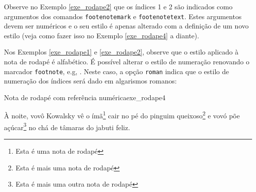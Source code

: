 Observe no Exemplo \ref{exe_rodape2} que os índices 1 e 2 são indicados como argumentos dos comandos {\tt footenotemark} e {\tt footenotetext}. Estes argumentos devem ser numéricos e o seu estilo é apenas alterado com a definição de um novo estilo (veja como fazer isso no Exemplo \ref{exe_rodape4} a diante).

%


Nos Exemplos \ref{exe_rodape1} e \ref{exe_rodape2}, observe que o estilo aplicado à nota de rodapé é alfabético. É possível alterar o estilo de numeração renovando o marcador {\tt footnote}, e.g, \texttt{\renewcommand{\thefootnote}{\roman{footnote}}}. Neste caso, a opção {\tt roman} indica que o estilo de numeração dos índices será dado em algarismos romanos:

\renewcommand{\thefootnote}{\Roman{footnote}}

\begin{texexptitled}[breakable,enhanced,middle=2mm]{Nota de rodapé com referência numérica}{exe_rodape4}
\renewcommand{\thefootnote}{\Roman{footnote}}

À noite, vovô Kowalsky vê o ímã\footnote{Esta é uma nota de rodapé} cair no pé do pinguim queixoso\footnote{Esta é mais uma nota de rodapé} e vovó põe açúcar\footnote{Esta é mais uma outra nota de rodapé} no chá de tâmaras do jabuti feliz.
\end{texexptitled}

